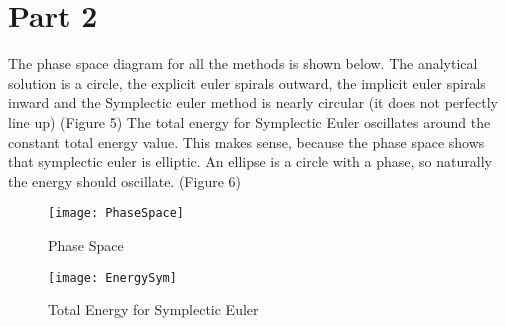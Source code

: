 \documentclass{article}
\begin{document}
\section{Part 2}

The phase space diagram for all the methods is shown below. The analytical solution is a circle, the explicit euler spirals outward, the implicit euler spirals inward and the Symplectic euler method is nearly circular (it does not perfectly line up) (Figure 5)
The total energy for Symplectic Euler oscillates around the constant total energy value. This makes sense, because the phase space shows that symplectic euler is elliptic. An ellipse is a circle with a phase, so naturally the energy should oscillate. (Figure 6)

\begin{figure}
\texttt{[image: PhaseSpace]}
\caption{Phase Space}
\end{figure}
\begin{figure}
\texttt{[image: EnergySym]}
\caption{Total Energy for Symplectic Euler}
\end{figure}
\end{document}
